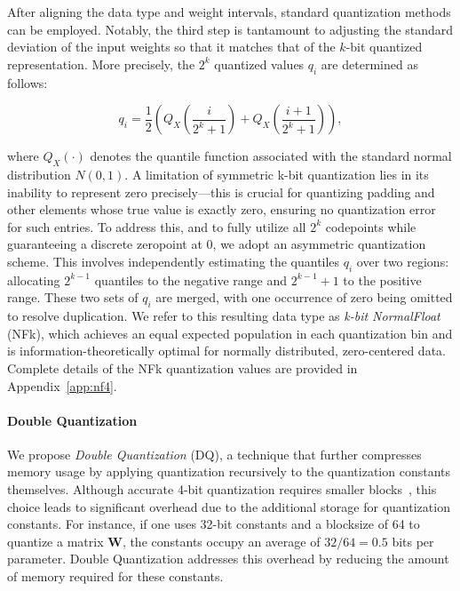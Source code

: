 After aligning the data type and weight intervals, standard quantization methods can be employed. Notably, the third step is tantamount to adjusting the standard deviation of the input weights so that it matches that of the $k$-bit quantized representation. More precisely, the $2^k$ quantized values $q_i$ are determined as follows:

\begin{equation}
q_i  = \frac{1}{2}\left( Q_X\left(\frac{i}{2^k+1}\right) + Q_X\left(\frac{i+1}{2^k+1}\right)\right),
\end{equation}

where $Q_X(\cdot)$ denotes the quantile function associated with the standard normal distribution $N(0,1)$. A limitation of symmetric k-bit quantization lies in its inability to represent zero precisely—this is crucial for quantizing padding and other elements whose true value is exactly zero, ensuring no quantization error for such entries. To address this, and to fully utilize all $2^k$ codepoints while guaranteeing a discrete zeropoint at $0$, we adopt an asymmetric quantization scheme. This involves independently estimating the quantiles $q_i$ over two regions: allocating $2^{k-1}$ quantiles to the negative range and $2^{k-1}+1$ to the positive range. These two sets of $q_i$ are merged, with one occurrence of zero being omitted to resolve duplication. We refer to this resulting data type as \emph{k-bit NormalFloat} (NFk), which achieves an equal expected population in each quantization bin and is information-theoretically optimal for normally distributed, zero-centered data. Complete details of the NFk quantization values are provided in Appendix~\ref{app:nf4}.

\paragraph{Double Quantization{}} 
We propose \emph{Double Quantization} (DQ), a technique that further compresses memory usage by applying quantization recursively to the quantization constants themselves. Although accurate 4-bit quantization requires smaller blocks~\citep{dettmers2022case}, this choice leads to significant overhead due to the additional storage for quantization constants. For instance, if one uses 32-bit constants and a blocksize of 64 to quantize a matrix $\mathbf{W}$, the constants occupy an average of $32/64 = 0.5$ bits per parameter. Double Quantization addresses this overhead by reducing the amount of memory required for these constants.

